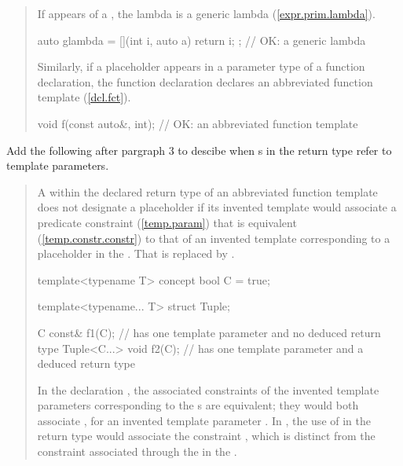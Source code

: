 \begin{quote}
\pnum
If  
appears  
 of a , the lambda 
is a generic lambda
(\ref{expr.prim.lambda}).
%
\enterexample
\begin{codeblock}
auto glambda = [](int i, auto a) { return i; }; // OK: a generic lambda
\end{codeblock}
\exitexample
%
\begin{addedblock}
Similarly, if a placeholder appears in a parameter type of a function 
declaration, the function declaration declares an abbreviated function 
template (\ref{dcl.fct}).
%
\enterexample
\begin{codeblock}
void f(const auto&, int); // OK: an abbreviated function template
\end{codeblock}
\exitexample
\end{addedblock}
\end{quote}


Add the following after pargraph 3 to descibe when 
s in the return type 
refer to template parameters.

\begin{quote}
\begin{addedblock}
\pnum
A  within the declared return 
type of an abbreviated function template does not designate a placeholder 
if its invented template  would associate
a predicate constraint (\ref{temp.param}) that is equivalent 
(\ref{temp.constr.constr}) to that of an invented template 
  corresponding to a
placeholder in the . 
% 
That  is replaced by .
\enterexample
\begin{codeblock}
template<typename T> concept bool C = true;

template<typename... T> struct Tuple;

C const& f1(C);         // has one template parameter and no deduced return type
Tuple<C...> void f2(C); // has one template parameter and a deduced return type
\end{codeblock}
In the declaration , the associated constraints of the invented
template parameters corresponding to the s
are equivalent; they would both associate , for an invented template 
parameter .
% 
In , the use of  in the return type would associate the
constraint , which is distinct from the constraint
 associated through the  
in the .
\exitexample
\end{addedblock}
\end{quote}


